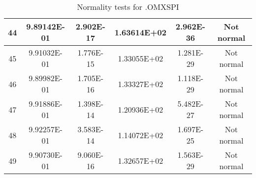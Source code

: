 \begin{table}[h]
\begin{tabular}{|c|c|c|c|c|c|}
		44 & 9.89142E-01 & 2.902E-17 & 1.63614E+02 & 2.962E-36 & Not normal\\\hline
		45 & 9.91032E-01 & 1.776E-15 & 1.33055E+02 & 1.281E-29 & Not normal\\\hline
		46 & 9.89982E-01 & 1.705E-16 & 1.33327E+02 & 1.118E-29 & Not normal\\\hline
		47 & 9.91886E-01 & 1.398E-14 & 1.20936E+02 & 5.482E-27 & Not normal\\\hline
		48 & 9.92257E-01 & 3.583E-14 & 1.14072E+02 & 1.697E-25 & Not normal\\\hline
		49 & 9.90730E-01 & 9.060E-16 & 1.32657E+02 & 1.563E-29 & Not normal\\\hline
	\end{tabular}
	\caption{Normality tests for .OMXSPI}
	\label{tab:normality_tests_OMXSPI}
\end{table}
